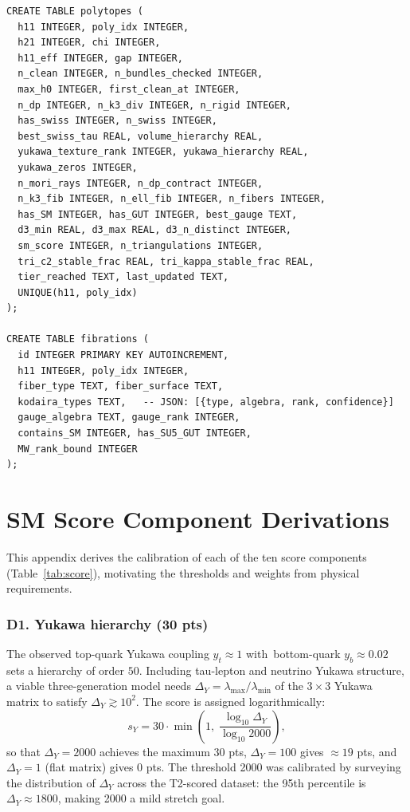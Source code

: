 \documentclass[11pt,a4paper]{article}
\begin{document}
\begin{verbatim}
CREATE TABLE polytopes (
  h11 INTEGER, poly_idx INTEGER,
  h21 INTEGER, chi INTEGER,
  h11_eff INTEGER, gap INTEGER,
  n_clean INTEGER, n_bundles_checked INTEGER,
  max_h0 INTEGER, first_clean_at INTEGER,
  n_dp INTEGER, n_k3_div INTEGER, n_rigid INTEGER,
  has_swiss INTEGER, n_swiss INTEGER,
  best_swiss_tau REAL, volume_hierarchy REAL,
  yukawa_texture_rank INTEGER, yukawa_hierarchy REAL,
  yukawa_zeros INTEGER,
  n_mori_rays INTEGER, n_dp_contract INTEGER,
  n_k3_fib INTEGER, n_ell_fib INTEGER, n_fibers INTEGER,
  has_SM INTEGER, has_GUT INTEGER, best_gauge TEXT,
  d3_min REAL, d3_max REAL, d3_n_distinct INTEGER,
  sm_score INTEGER, n_triangulations INTEGER,
  tri_c2_stable_frac REAL, tri_kappa_stable_frac REAL,
  tier_reached TEXT, last_updated TEXT,
  UNIQUE(h11, poly_idx)
);

CREATE TABLE fibrations (
  id INTEGER PRIMARY KEY AUTOINCREMENT,
  h11 INTEGER, poly_idx INTEGER,
  fiber_type TEXT, fiber_surface TEXT,
  kodaira_types TEXT,   -- JSON: [{type, algebra, rank, confidence}]
  gauge_algebra TEXT, gauge_rank INTEGER,
  contains_SM INTEGER, has_SU5_GUT INTEGER,
  MW_rank_bound INTEGER
);
\end{verbatim}

\section{SM Score Component Derivations}
\label{app:score}

This appendix derives the calibration of each of the ten score
components (Table~\ref{tab:score}), motivating the thresholds and
weights from physical requirements.

\subsubsection*{D1. Yukawa hierarchy (30 pts)}

The observed top-quark Yukawa coupling $y_t \approx 1$ with\
bottom-quark $y_b \approx 0.02$ sets a hierarchy of order $50$.
Including tau-lepton and neutrino Yukawa structure, a viable
three-generation model needs $\Delta_Y = \lambda_{\max}/\lambda_{\min}$
of the $3\times 3$ Yukawa matrix to satisfy $\Delta_Y \gtrsim 10^2$.
The score is assigned logarithmically:
\[
  s_Y = 30 \cdot \min\!\left(1,\;
    \frac{\log_{10}\Delta_Y}{\log_{10} 2000}\right),
\]
so that $\Delta_Y = 2000$ achieves the maximum 30 pts,
$\Delta_Y = 100$ gives $\approx 19$ pts,
and $\Delta_Y = 1$ (flat matrix) gives 0 pts.
The threshold 2000 was calibrated by surveying the distribution
of $\Delta_Y$ across the T2-scored dataset: the 95th percentile
is $\Delta_Y \approx 1800$, making 2000 a mild stretch goal.
\end{document}
